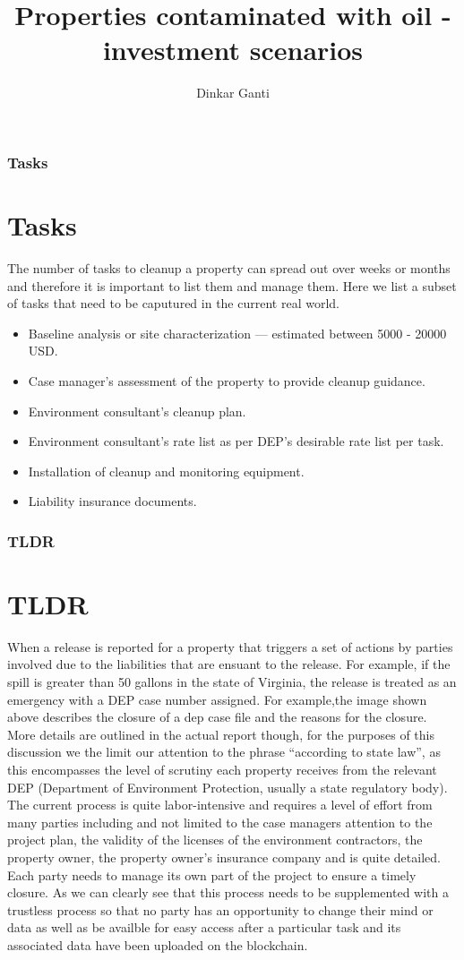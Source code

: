 \documentclass{beamer}
\title{Properties contaminated with oil - investment scenarios}
\author{Dinkar Ganti}
\newcommand{\quotes}[1]{``#1''}
\begin{document}
\begin{frame}
  \titlepage
\end{frame}
\begin{frame}
\frametitle{Tasks}
\section{Tasks}
  The number of tasks to cleanup a property can spread out over weeks or months and therefore it is important to list them and manage them. Here we list a subset of tasks that need to be caputured in the current real world.
  \begin{itemize}
    \item Baseline analysis or site characterization --- estimated between 5000 - 20000 USD.
    \item Case manager's assessment of the property to provide cleanup guidance.
    \item Environment consultant's cleanup plan.
    \item Environment consultant's rate list as per DEP's desirable rate list per task. 
    \item Installation of cleanup and monitoring equipment.
    \item Liability insurance documents.
  \end{itemize}
\end{frame}
\begin{frame}
\frametitle{TLDR}
\section{TLDR}
  When a release is reported for a property that triggers a set of actions by parties involved due to the liabilities that are ensuant to the release. For example, if the spill is greater than 50 gallons in the state of Virginia, the release is treated as an emergency with a DEP case number assigned. For example,the image shown above describes the closure of a dep case file and the reasons for the closure. More details are outlined in the actual report though, for the purposes of this discussion we the limit our attention to the phrase \quotes{according to state law}, as this encompasses the level of scrutiny each property receives from the relevant DEP (Department of Environment Protection, usually a state regulatory body). The current process is quite labor-intensive and requires a level of effort from many parties including and not limited to the case managers attention to the project plan, the validity of the licenses of the environment contractors, the property owner, the property owner's insurance company and is quite detailed. Each party needs to manage its own part of the project to ensure a timely closure. As we can clearly see that this process needs to be supplemented with a trustless process so that no party has an opportunity to change their mind or data as well as be availble for easy access after a particular task and its associated data have been uploaded on the blockchain.
  
\end{frame}
\end{document}
